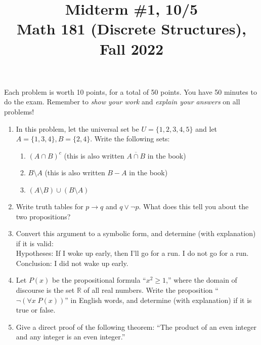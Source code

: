 \documentclass[11pt]{article}
\title{Midterm \#1, 10/5 \\Math 181 (Discrete Structures), Fall 2022}
\date{}
\begin{document}
\maketitle

\thispagestyle{empty}

\vspace{-1cm}

Each problem is worth 10 points, for a total of 50 points. You have 50 minutes to do the exam. Remember to \emph{show your work} and \emph{explain your answers} on all problems! 

\begin{enumerate}
\item In this problem, let the universal set be $U = \{1,2,3,4,5\}$ and let $A=\{1,3,4\}, B=\{2,4\}$. Write the following sets:
\begin{enumerate}
\item $(A\cap B)^c$ \hfill (this is also written $\overline{A\cap B}$ in the book)
\item $B \setminus A$ \hfill (this is also written $B-A$ in the book)
\item $(A \setminus B) \cup (B \setminus A)$
\end{enumerate}
\item Write truth tables for $p \to q$ and $q \vee \neg p$. What does this tell you about the two propositions?
\item Convert this argument to a symbolic form, and determine (with explanation) if it is valid: \\[0.5em]
Hypotheses: If I woke up early, then I'll go for a run. I do not go for a run. \\
Conclusion: I did not wake up early.
\item Let $P(x)$ be the propositional formula ``$x^2 \geq 1$,'' where the domain of discourse is the set $\mathbb{R}$ of all real numbers. Write the proposition ``$\neg (\forall x \; P(x))$'' in English words, and determine (with explanation) if it is true or false.
\item Give a direct proof of the following theorem: ``The product of an even integer and any integer is an even integer.''
\end{enumerate}
\end{document}
